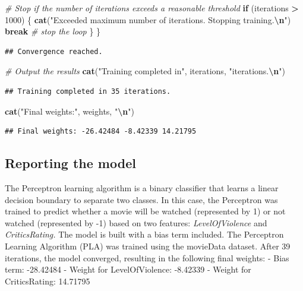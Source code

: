 \documentclass[
]{article}
\newenvironment{Shaded}{\begin{snugshade}}{\end{snugshade}}
\newcommand{\CommentTok}[1]{\textcolor[rgb]{0.56,0.35,0.01}{\textit{#1}}}
\newcommand{\ControlFlowTok}[1]{\textcolor[rgb]{0.13,0.29,0.53}{\textbf{#1}}}
\newcommand{\DecValTok}[1]{\textcolor[rgb]{0.00,0.00,0.81}{#1}}
\newcommand{\FunctionTok}[1]{\textcolor[rgb]{0.13,0.29,0.53}{\textbf{#1}}}
\newcommand{\NormalTok}[1]{#1}
\newcommand{\SpecialCharTok}[1]{\textcolor[rgb]{0.81,0.36,0.00}{\textbf{#1}}}
\newcommand{\StringTok}[1]{\textcolor[rgb]{0.31,0.60,0.02}{#1}}
\begin{document}
\begin{Shaded}
\begin{Highlighting}[]
  \CommentTok{\# Stop if the number of iterations exceeds a reasonable threshold}
  \ControlFlowTok{if}\NormalTok{ (iterations }\SpecialCharTok{\textgreater{}} \DecValTok{1000}\NormalTok{) \{}
    \FunctionTok{cat}\NormalTok{(}\StringTok{"Exceeded maximum number of iterations. Stopping training.}\SpecialCharTok{\textbackslash{}n}\StringTok{"}\NormalTok{)}
    \ControlFlowTok{break} \CommentTok{\# stop the loop}
\NormalTok{  \}}
\NormalTok{\}}
\end{Highlighting}
\end{Shaded}

\begin{verbatim}
## Convergence reached.
\end{verbatim}

\begin{Shaded}
\begin{Highlighting}[]
\CommentTok{\# Output the results}
\FunctionTok{cat}\NormalTok{(}\StringTok{"Training completed in"}\NormalTok{, iterations, }\StringTok{"iterations.}\SpecialCharTok{\textbackslash{}n}\StringTok{"}\NormalTok{) }
\end{Highlighting}
\end{Shaded}

\begin{verbatim}
## Training completed in 35 iterations.
\end{verbatim}

\begin{Shaded}
\begin{Highlighting}[]
\FunctionTok{cat}\NormalTok{(}\StringTok{"Final weights:"}\NormalTok{, weights, }\StringTok{"}\SpecialCharTok{\textbackslash{}n}\StringTok{"}\NormalTok{)}
\end{Highlighting}
\end{Shaded}

\begin{verbatim}
## Final weights: -26.42484 -8.42339 14.21795
\end{verbatim}

\subsection{Reporting the model}\label{reporting-the-model}

The Perceptron learning algorithm is a binary classifier that learns a
linear decision boundary to separate two classes. In this case, the
Perceptron was trained to predict whether a movie will be watched
(represented by 1) or not watched (represented by -1) based on two
features: \emph{LevelOfViolence} and \emph{CriticsRating.} The model is
built with a bias term included. The Perceptron Learning Algorithm (PLA)
was trained using the movieData dataset. After 39 iterations, the model
converged, resulting in the following final weights: - Bias term:
-28.42484 - Weight for LevelOfViolence: -8.42339 - Weight for
CriticsRating: 14.71795
\end{document}
